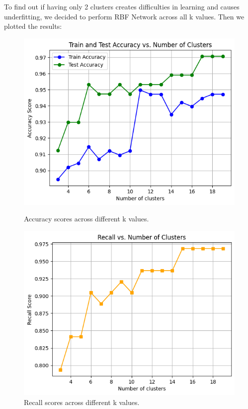 \documentclass[a4paper,12pt]{article}
\begin{document}
To find out if having only 2 clusters creates difficulties in learning and causes underfitting, we decided to perform RBF Network across all k values. Then we plotted the results:
\begin{figure}[H]
    \centering
    \begin{minipage}[t]{0.48\textwidth}
        \centering
        \includegraphics[width=\textwidth]{imgs/acc_rbf.png}
        \caption{Accuracy scores across different k values.}
        \label{fig:acc_recall}
    \end{minipage}
    \hfill
    \begin{minipage}[t]{0.48\textwidth}
        \centering
        \includegraphics[width=\textwidth]{imgs/recall_rbf.png}
        \caption{Recall scores across different k values.}
        \label{fig:recall_rbf}
    \end{minipage}
\end{figure}
\end{document}
